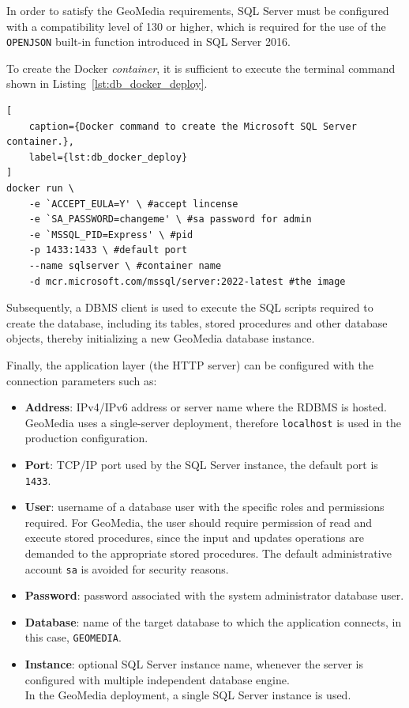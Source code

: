In order to satisfy the GeoMedia requirements, SQL Server must be configured with a compatibility level of 130 or higher, which is required for the use of the \texttt{OPENJSON} built-in function introduced in SQL Server 2016.

To create the Docker \textit{container}, it is sufficient to execute the terminal command shown in Listing~\ref{lst:db_docker_deploy}.


\begin{lstlisting}[
    caption={Docker command to create the Microsoft SQL Server container.},
    label={lst:db_docker_deploy}
]
docker run \
    -e `ACCEPT_EULA=Y' \ #accept lincense
    -e `SA_PASSWORD=changeme' \ #sa password for admin
    -e `MSSQL_PID=Express' \ #pid
    -p 1433:1433 \ #default port
    --name sqlserver \ #container name
    -d mcr.microsoft.com/mssql/server:2022-latest #the image
\end{lstlisting}

Subsequently, a DBMS client is used to execute the SQL scripts required to create the database, including its tables, stored procedures and other database objects, thereby initializing a new GeoMedia database instance.

Finally, the application layer (the HTTP server) can be configured with the connection parameters such as:
\begin{itemize}
    \item \textbf{Address}: IPv4/IPv6 address or server name where the RDBMS is hosted. GeoMedia uses a single-server deployment, therefore \texttt{localhost} is used in the production configuration.
    \item \textbf{Port}: TCP/IP port used by the SQL Server instance, the default port is \texttt{1433}.
    \item \textbf{User}: username of a database user with the specific roles and permissions required. For GeoMedia, the user should require permission of read and execute stored procedures, since the input and updates operations are demanded to the appropriate stored procedures. The default administrative account \texttt{sa} is avoided for security reasons.
    \item \textbf{Password}: password associated with the system administrator database user.
    \item \textbf{Database}: name of the target database to which the application connects, in this case, \texttt{GEOMEDIA}.
    \item \textbf{Instance}: optional SQL Server instance name, whenever the server is configured with multiple independent database engine. \\
    In the GeoMedia deployment, a single SQL Server instance is used.
\end{itemize}

